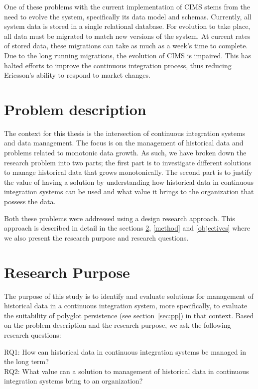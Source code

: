 One of these problems with the current implementation of CIMS stems from the need to evolve the system, specifically its data model and schemas. Currently, all system data is stored in a single relational database. For evolution to take place, all data must be migrated to match new versions of the system. At current rates of stored data, these migrations can take as much as a week's time to complete. Due to the long running migrations, the evolution of CIMS is impaired. This has halted efforts to improve the continuous integration process, thus reducing Ericsson's ability to respond to market changes.

\section{Problem description}
The context for this thesis is the intersection of continuous integration systems and data management. The focus is on the management of historical data and problems related to monotonic data growth. As such, we have broken down the research problem into two parts; the first part is to investigate different solutions to manage historical data that grows monotonically. The second part is to justify the value of having a solution by understanding how historical data in continuous integration systems can be used and what value it brings to the organization that possess the data. 

Both these problems were addressed using a design research approach. This approach is described in detail in the sections \ref{purpose}, \ref{method} and \ref{objectives} where we also present the research purpose and research questions.

\section{Research Purpose}
\label{purpose}
The purpose of this study is to identify and evaluate solutions for management of historical data in a continuous integration system, more specifically, to evaluate the suitability of polyglot persistence (see section~\ref{sec:pp}) in that context. Based on the problem description and the research purpose, we ask the following research questions:

RQ1: How can historical data in continuous integration systems be managed in the long term? \\
RQ2: What value can a solution to management of historical data in continuous integration systems bring to an organization?

